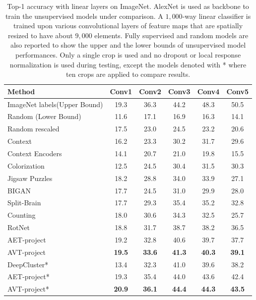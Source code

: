 \documentclass[10pt,journal,compsoc,twoside]{IEEEtran}
\begin{document}
\begin{table}
\caption{Top-1 accuracy with linear layers on ImageNet. AlexNet is used as backbone to train the unsupervised models under comparison. A $1,000$-way linear classifier is trained upon various convolutional layers of feature maps that are spatially resized to have about $9,000$ elements. Fully supervised and random models are also reported to show the upper and the lower bounds of unsupervised model performances. Only a single crop is used and no dropout or local response normalization is used during testing, except the models denoted with * where ten crops are applied to compare results.}\label{tab06}
\centering
 \begin{tabular}{l|ccccc} \toprule
Method&Conv1 &Conv2&Conv3&Conv4&Conv5\\ \midrule
ImageNet labels(Upper Bound)&19.3&36.3&44.2&48.3&50.5  \\
Random (Lower Bound)&11.6 &17.1&16.9&16.3&14.1  \\
Random rescaled \cite{krahenbuhl2015data}&17.5 &23.0&24.5&23.2&20.6  \\
\midrule
Context \cite{doersch2015unsupervised} &16.2&23.3&30.2&31.7&29.6 \\
Context Encoders \cite{pathak2016context}&14.1&20.7&21.0&19.8&15.5 \\
Colorization\cite{zhang2016colorful}&12.5&24.5&30.4&31.5&30.3\\
Jigsaw Puzzles \cite{noroozi2016unsupervised}&18.2&28.8&34.0&33.9&27.1\\
BIGAN \cite{donahue2016adversarial}&17.7&24.5&31.0&29.9&28.0\\
Split-Brain \cite{zhang2017split}&17.7&29.3&35.4&35.2&32.8\\
Counting \cite{zhang2017split}&18.0&30.6&34.3&32.5&25.7\\
RotNet \cite{gidaris2018unsupervised}&18.8&31.7&38.7&38.2&36.5\\\midrule
AET-project &19.2&32.8&40.6&39.7&37.7\\
AVT-project &\bf 19.5&\bf 33.6&\bf 41.3&\bf 40.3&\bf 39.1\\
\bottomrule
\toprule
DeepCluster* \cite{caron2018deep} &13.4&32.3&41.0&39.6&38.2\\\midrule
AET-project*  &19.3&35.4&44.0&43.6&42.4\\
AVT-project*&\textbf{20.9}&\textbf{36.1}&\textbf{44.4}&\textbf{44.3}&\textbf{43.5}\\\bottomrule
\end{tabular}
\end{table}
\end{document}
